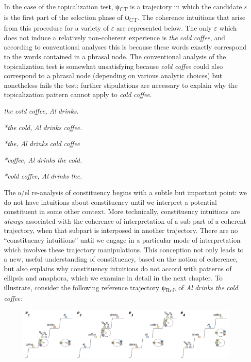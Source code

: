   In the case of the topicalization test, ψ\textsubscript{CT} is a trajectory in which the candidate $\varepsilon $ is the first part of the selection phase of ψ\textsubscript{CT}. The coherence intuitions that arise from this procedure for a variety of $\varepsilon $ are represented below. The only $\varepsilon $ which does not induce a relatively non-coherent experience is \textit{the} \textit{cold} \textit{coffee}, and according to conventional analyses this is because these words exactly correspond to the words contained in a phrasal node. The conventional analysis of the topicalization test is somewhat unsatisfying because \textit{cold} \textit{coffee} could also correspond to a phrasal node (depending on various analytic choices) but nonetheless fails the test; further stipulations are necessary to explain why the topicalization pattern cannot apply to \textit{cold} \textit{coffee}.

\textit{the} \textit{cold} \textit{coffee,} \textit{Al} \textit{drinks.}

\textit{*the} \textit{cold,} \textit{Al} \textit{drinks} \textit{coffee.}

\textit{*the,} \textit{Al} \textit{drinks} \textit{cold} \textit{coffee}

\textit{*coffee,} \textit{Al} \textit{drinks} \textit{the} \textit{cold.}

\textit{*cold} \textit{coffee,} \textit{Al} \textit{drinks} \textit{the.}

  The o/el re-analysis of constituency begins with a subtle but important point: we do not have intuitions about constituency until we interpret a potential constituent in some other context. More technically, constituency intuitions are \textit{always} associated with the coherence of interpretation of a sub-part of a coherent trajectory, when that subpart is interposed in another trajectory. There are no “constituency intuitions” until we engage in a particular mode of interpretation which involves these trajectory manipulations. This conception not only leads to a new, useful understanding of constituency, based on the notion of coherence, but also explains why constituency intuitions do not accord with patterns of ellipsis and anaphora, which we examine in detail in the next chapter. To illustrate, consider the following reference trajectory ψ\textsubscript{Ref}, of \textit{Al} \textit{drinks} \textit{the} \textit{cold} \textit{coffee}:

  
\begin{figure}
\includegraphics[width=\textwidth]{figures/Tilsen-img137.png}
\caption{\missingcaption}
\label{fig:}
\end{figure}
  

